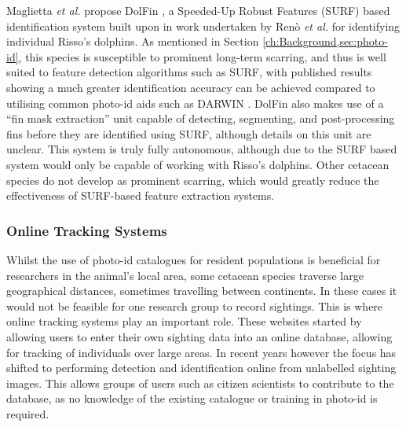 Maglietta \textit{et al.} propose DolFin \cite{maglietta_dolfin_2018}, a Speeded-Up Robust Features (SURF) based identification system \cite{bay_speeded-up_2008} built upon in work undertaken by Renò \textit{et al.} \cite{reno_sift-based_2019} for identifying individual Risso's dolphins. As mentioned in Section \ref{ch:Background,sec:photo-id}, this species is susceptible to prominent long-term scarring, and thus is well suited to feature detection algorithms such as SURF, with published results showing a much greater identification accuracy can be achieved compared to utilising common photo-id aids such as DARWIN \cite{hale_unsupervised_2012}. DolFin also makes use of a ``fin mask extraction'' unit capable of detecting, segmenting, and post-processing fins before they are identified using SURF, although details on this unit are unclear. This system is truly fully autonomous, although due to the SURF based system would only be capable of working with Risso's dolphins. Other cetacean species do not develop as prominent scarring, which would greatly reduce the effectiveness of SURF-based feature extraction systems. 

\subsubsection{Online Tracking Systems}\label{ch:Background,sec:conTech,sub:photoIDAides,subsub:OnlineTracking}

Whilst the use of photo-id catalogues for resident populations is beneficial for researchers in the animal's local area, some cetacean species traverse large geographical distances, sometimes travelling between continents. In these cases it would not be feasible for one research group to record sightings. This is where online tracking systems play an important role. These websites started by allowing users to enter their own sighting data into an online database, allowing for tracking of individuals over large areas. In recent years however the focus has shifted to performing detection and identification online from unlabelled sighting images. This allows groups of users such as citizen scientists to contribute to the database, as no knowledge of the existing catalogue or training in photo-id is required.

